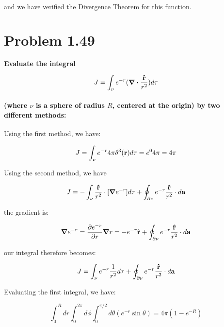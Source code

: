 \documentclass{article}
\numberwithin{equation}{section}
\newcommand{\vbh}[1]{\vb{\hat{#1}}}
\begin{document}
and we have verified the Divergence Theorem for this function.

\section{Problem 1.49}

\textbf{Evaluate the integral}

\begin{equation*}
    J = \int_{\nu} e^{-r} (\div \frac{\vbh{r}}{r^2}) d \tau
\end{equation*}

\paragraph{(where $\nu$ is a sphere of radius $R$, centered at the origin) by two different methods:\\}

Using the first method, we have: 

\begin{equation}
    J = \int_{\nu} e^{-r} 4 \pi \delta^3 (\vb{r}) d \tau = e^0 4 \pi = 4 \pi 
\end{equation}

Using the second method, we have 

\begin{equation}
    J = - \int_\nu \frac{\vbh{r}}{r^2} \cdot \lbrack \grad e^{-r} \rbrack d \tau + \oint_{\partial \nu} e^{-r} \frac{\vbh{r}}{r^2} \cdot d \vb{a}
\end{equation}

the gradient is:

\begin{equation}
    \grad e^{-r} = \frac{\partial e^{-r}}{\partial r} \grad r = -e^{-r} \vbh{r} + \oint_{\partial \nu} e^{-r} \frac{\vbh{r}}{r^2} \cdot d \vb{a}
\end{equation}

our integral therefore becomes:

\begin{equation}
    J = \int_{\nu} e^{-r} \frac{1}{r^2} d\tau + \oint_{\partial \nu} e^{-r} \frac{\vbh{r}}{r^2} \cdot d \vb{a} 
\end{equation}

Evaluating the first integral, we have:

\begin{equation}
    \int_0^R dr \int_0^{2\pi} d \phi \int_0^{\pi/2} d \theta (e^{-r} \sin \theta) = 4\pi (1-e^{-R}) 
\end{equation}
\end{document}

